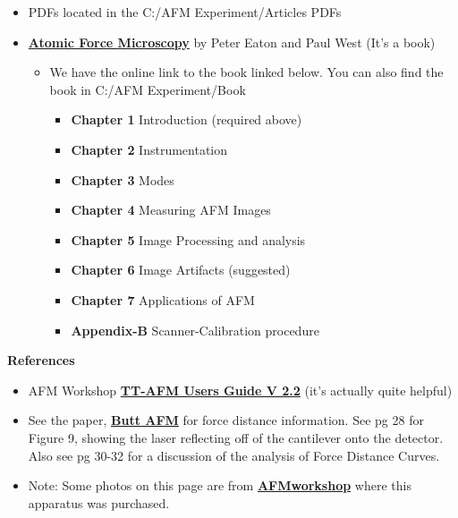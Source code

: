 \documentclass{../lab}
\begin{document}
\begin{itemize}
    \item PDFs located in the C:/AFM Experiment/Articles PDFs

    \item \href{http://experimentationlab.berkeley.edu/afm-book}{\textbf{Atomic Force Microscopy}} by Peter Eaton and Paul West (It's a book)
    \begin{itemize}
        \item We have the online link to the book linked below.  You can also find the book in C:/AFM Experiment/Book

        \begin{itemize}
            \item \textbf{Chapter 1} Introduction (required above)

            \item \textbf{Chapter 2} Instrumentation

            \item \textbf{Chapter 3} Modes

            \item \textbf{Chapter 4} Measuring AFM Images

            \item \textbf{Chapter 5} Image Processing and analysis

            \item \textbf{Chapter 6} Image Artifacts (suggested)

            \item \textbf{Chapter 7} Applications of AFM

            \item \textbf{Appendix-B} Scanner-Calibration procedure

        \end{itemize}

    \end{itemize}

\end{itemize}

\textbf{References}

\begin{itemize}
    \item AFM Workshop \href{http://experimentationlab.berkeley.edu/sites/default/files/AFMImages/TT_AFM\%20User-Guide-V2.2-600DPI.pdf}{\textbf{TT-AFM Users Guide V 2.2}} (it's actually quite helpful)

    \item See the paper, \href{http://experimentationlab.berkeley.edu/sites/default/files/AFMImages/butt\_AFM.pdf}{\textbf{Butt AFM}} for force distance information.  See pg 28 for Figure 9, showing the laser reflecting off of the cantilever onto the detector.  Also see pg 30-32 for a discussion of the analysis of Force Distance Curves.

    \item Note: Some photos on this page are from \href{http://www.afmworkshop.com/}{\textbf{AFMworkshop}} where this apparatus was purchased.

\end{itemize}
\end{document}
